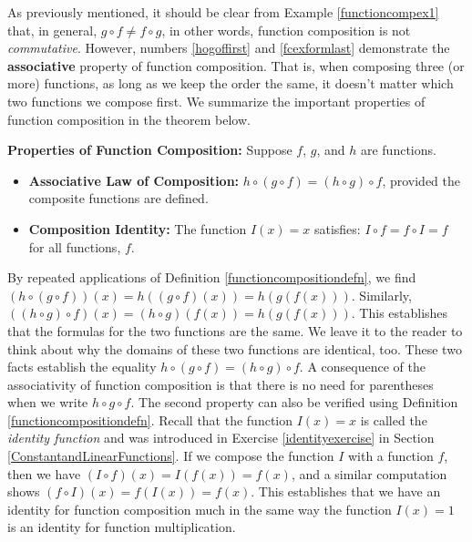 \documentclass{ximera}
\begin{document}
As previously mentioned, it should be clear from  Example \ref{functioncompex1} that, in general, $g \circ f \neq f \circ g$, in other words, function composition is not \textit{commutative}.  However, numbers \ref{hogoffirst} and  \ref{fcexformlast} demonstrate the  \textbf{associative} property of function composition.  That is, when composing three (or more) functions, as long as we keep the order the same, it doesn't matter which two functions we compose first.  We summarize the important properties of function composition in the theorem below.

\begin{theorem}\label{functioncompprops}  \textbf{Properties of Function Composition:} Suppose $f$, $g$, and $h$ are functions.  

\begin{itemize}

\item  \textbf{Associative Law of Composition:} $h \circ (g \circ f) = (h \circ g) \circ f$, provided the composite functions are defined.

\item  \textbf{Composition Identity:}  The function $I(x) = x$ satisfies:  $ I \circ f = f \circ I =f$ for all functions, $f$.

\end{itemize}

\end{theorem}

By repeated applications of Definition \ref{functioncompositiondefn}, we find  $(h \circ (g \circ f))(x) = h((g \circ f)(x)) = h(g(f(x)))$.  Similarly, $((h \circ g) \circ f)(x) = (h \circ g)(f(x)) = h(g(f(x)))$.  This establishes that the formulas for the two functions are the same.  We leave it to the reader to think about why the domains of these two functions are identical, too.  These two facts establish the equality $h \circ (g \circ f) = (h \circ g) \circ f$.  A consequence of the associativity of function composition is that there is no need for parentheses when we write $h \circ g \circ f$. The second property can also be verified using Definition \ref{functioncompositiondefn}.  Recall that the function $I(x) = x$ is called the  \textit{identity function} and was introduced in Exercise  \ref{identityexercise} in Section \ref{ConstantandLinearFunctions}.  If we compose the function $I$ with a function $f$, then we have $(I \circ f)(x) = I(f(x)) = f(x)$, and a similar computation shows $(f\circ I)(x) = f(I(x)) = f(x)$. This establishes that we have an identity for function composition much in the same way the function $I(x) = 1$ is an identity for function multiplication. 
\end{document}
